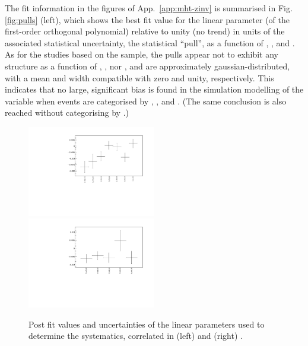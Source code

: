 The fit information in the figures of App.~\ref{app:mht-zinv} is
summarised in Fig.\ref{fig:pulls} (left), which shows the best fit
value for the linear parameter (of the first-order orthogonal
polynomial) relative to unity (\ie no trend) in units of the
associated statistical uncertainty, \ie the statistical ``pull'', as a
function of \njet, \nb, and \scalht. As for the studies based on the
\mj sample, the pulls appear not to exhibit any structure as a
function of \njet, \nb, nor \scalht, and are approximately
gaussian-distributed, with a mean and width compatible with zero and
unity, respectively. This indicates that no large, significant bias is
found in the simulation modelling of the \mht variable when events are
categorised by \njet, \scalht, and \nb. (The same conclusion is also
reached without categorising by \nb.)
\begin{figure}[h!]
  \centering
  \includegraphics[width=0.5\textwidth]{figures/mhtTemplate/exclusive_corr_njet/MuMu_graph}~
  \includegraphics[width=0.5\textwidth]{figures/mhtTemplate/exclusive_corr_ht/MuMu_graph}\\
  \caption{\label{fig:postFitMuMu} Post fit values and uncertainties of
    the linear parameters used to determine the systematics,
    correlated in (left) \njet and (right) \scalht.}
\end{figure}

